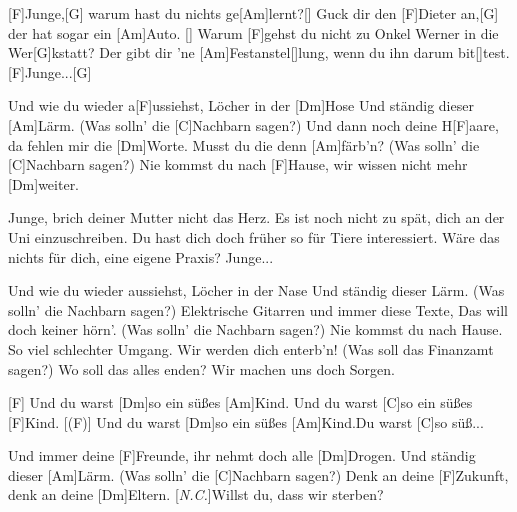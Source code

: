 

\hfill{}

\begin{guitar}
	[F]Junge,[G] warum hast du nichts ge[Am]lernt?[]{}
	Guck dir den [F]Dieter an,[G] der hat sogar ein [Am]Auto. []{}
	Warum [F]gehst du nicht zu Onkel Werner in die Wer[G]kstatt?
	Der gibt dir 'ne [Am]Festanstel[]lung, wenn du ihn darum bit[]test.
	[F]Junge...[G]{}
	
	Und wie du wieder a[F]ussiehst, Löcher in der [Dm]Hose
	Und ständig dieser [Am]Lärm. (Was solln' die [C]Nachbarn sagen?)
	Und dann noch deine H[F]aare, da fehlen mir die [Dm]Worte.
	Musst du die denn [Am]färb'n? (Was solln' die [C]Nachbarn sagen?)
	Nie kommst du nach [F]Hause, wir wissen nicht mehr [Dm]weiter.
	
	Junge, brich deiner Mutter nicht das Herz.
	Es ist noch nicht zu spät, dich an der Uni einzuschreiben.
	Du hast dich doch früher so für Tiere interessiert.
	Wäre das nichts für dich, eine eigene Praxis?
	Junge...
	
	Und wie du wieder aussiehst, Löcher in der Nase
	Und ständig dieser Lärm. (Was solln' die Nachbarn sagen?)
	Elektrische Gitarren und immer diese Texte,
	Das will doch keiner hörn'. (Was solln' die Nachbarn sagen?)
	Nie kommst du nach Hause. So viel schlechter Umgang.
	Wir werden dich enterb'n! (Was soll das Finanzamt sagen?)
	Wo soll das alles enden? Wir machen uns doch Sorgen.
	
	[F] Und du warst [Dm]so ein süßes [Am]Kind. Und du warst [C]so ein süßes [F]Kind.
	[(F)] Und du warst [Dm]so ein süßes [Am]Kind.Du warst [C]so süß...
	
	Und immer deine [F]Freunde, ihr nehmt doch alle [Dm]Drogen.
	Und ständig dieser [Am]Lärm. (Was solln' die [C]Nachbarn sagen?)
	Denk an deine [F]Zukunft, denk an deine [Dm]Eltern.
	[\textit{N.C.}]Willst du, dass wir sterben? 
\end{guitar}